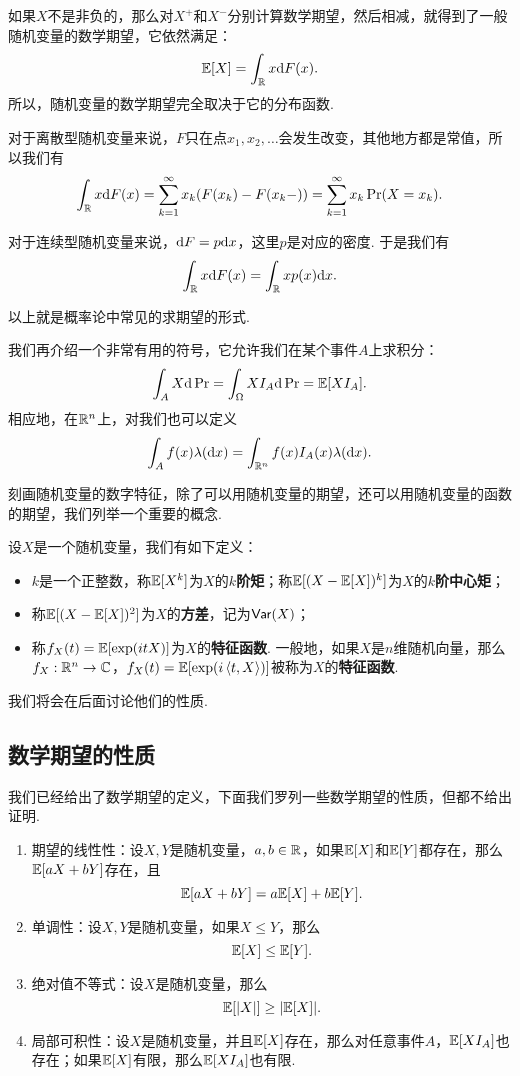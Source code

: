 如果$X$不是非负的，那么对$X^+$和$X^-$分别计算数学期望，然后相减，就得到了一般随机变量的数学期望，它依然满足：
\[\mathbb{E}[X]=\int_{\mathbb{R}} x\mathrm{d} F(x).\]
所以，随机变量的数学期望完全取决于它的分布函数. 

对于离散型随机变量来说，$F$只在点$x_1,x_2,\dots$会发生改变，其他地方都是常值，所以我们有
\[\int_{\mathbb{R}} x\mathrm{d} F(x)=\sum_{k=1}^\infty x_k(F(x_k)-F(x_k-))=\sum_{k=1}^\infty x_k\Pr(X=x_k).\]

对于连续型随机变量来说，$\mathrm{d} F=p\mathrm{d} x$，这里$p$是对应的密度. 于是我们有
\[\int_{\mathbb{R}} x\mathrm{d} F(x)=\int_{\mathbb{R}} x p(x)\mathrm{d} x.\]

以上就是概率论中常见的求期望的形式. 

我们再介绍一个非常有用的符号，它允许我们在某个事件$A$上求积分：
\[\int_A X\mathrm{d}\Pr=\int_{\Omega} XI_A\mathrm{d}\Pr=\mathbb{E}[XI_A].\]
相应地，在$\mathbb{R}^n$上，对我们也可以定义
\[\int_A f(x)\lambda(\mathrm{d} x)=\int_{\mathbb{R}^n} f(x)I_A(x)\lambda(\mathrm{d} x).\]


刻画随机变量的数字特征，除了可以用随机变量的期望，还可以用随机变量的函数的期望，我们列举一个重要的概念. 

\begin{definition}[矩，方差，特征函数]
设$X$是一个随机变量，我们有如下定义：
\begin{itemize}
    \item $k$是一个正整数，称$\mathbb{E}[X^k]$为$X$的\textbf{$k$阶矩}；称$\mathbb{E}[(X-\mathbb{E}[X])^k]$为$X$的\textbf{$k$阶中心矩}；
    \item 称$\mathbb{E}[(X-\mathbb{E}[X])^2]$为$X$的\textbf{方差}，记为$\mathsf{Var}(X)$；
    \item 称$f_X(t)=\mathbb{E}[\exp(i tX)]$为$X$的\textbf{特征函数}. 一般地，如果$X$是$n$维随机向量，那么$f_X:\mathbb{R}^n\to\mathbb{C}$，$f_X(t)=\mathbb{E}[\exp(i\left\langle{t},{X}\right\rangle)]$被称为$X$的\textbf{特征函数}. 
\end{itemize}
\end{definition}
我们将会在后面讨论他们的性质. 

\subsection{数学期望的性质}

我们已经给出了数学期望的定义，下面我们罗列一些数学期望的性质，但都不给出证明. 

\begin{proposition}\label{prop:expectation-property}
\begin{enumerate}
\item 期望的线性性：设$X,Y$是随机变量，$a,b\in\mathbb{R}$，如果$\mathbb{E}[X]$和$\mathbb{E}[Y]$都存在，那么$\mathbb{E}[aX+bY]$存在，且
\[\mathbb{E}[aX+bY]=a\mathbb{E}[X]+b\mathbb{E}[Y].\]
\item 单调性：设$X,Y$是随机变量，如果$X\leq Y$，那么
\[\mathbb{E}[X]\leq \mathbb{E}[Y].\]
\item 绝对值不等式：设$X$是随机变量，那么
\[\mathbb{E}[|X|]\geq |\mathbb{E}[X]|.\]
\item 局部可积性：设$X$是随机变量，并且$\mathbb{E}[X]$存在，那么对任意事件$A$，$\mathbb{E}[XI_A]$也存在；如果$\mathbb{E}[X]$有限，那么$\mathbb{E}[XI_A]$也有限. 
\end{enumerate}
\end{proposition}

